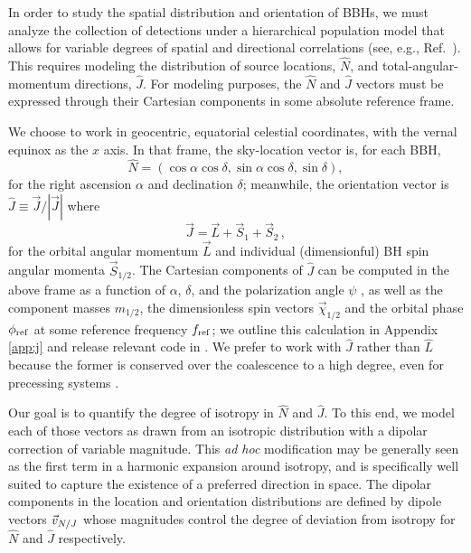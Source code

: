 \documentclass[aps,prd,twocolumn,superscriptaddress,preprintnumbers,floatfix,nofootinbib]{revtex4-2}
\begin{document}
In order to study the spatial distribution and orientation of \acp{BBH}, we must analyze the collection of detections under a hierarchical population model that allows for variable degrees of spatial and directional correlations (see, e.g., Ref.~\cite{Essick:2022slj}).
This requires modeling the distribution of source locations, $\hat{N}$, and total-angular-momentum directions, $\hat{J}$.
For modeling purposes, the $\hat{N}$ and $\hat{J}$ vectors must be expressed through their Cartesian components in some absolute reference frame.

We choose to work in geocentric, equatorial celestial coordinates, with the vernal equinox as the $x$ axis.
In that frame, the sky-location vector is, for each \ac{BBH},
\begin{equation} \label{eq:n}
\hat{N} = \left( \cos\alpha \cos\delta, \sin\alpha \cos\delta, \sin\delta \right) ,
\end{equation}
for the right ascension $\alpha$ and declination $\delta$; meanwhile, the orientation vector is $\hat{J} \equiv \vec{J} / |\vec{J}|$ where
\begin{equation} \label{eq:j}
\vec{J} = \vec{L} + \vec{S}_1 + \vec{S}_2 \, ,
\end{equation}
for the orbital angular momentum $\vec{L}$ and individual (dimensionful) \ac{BH} spin angular momenta $\vec{S}_{1/2}$.
The Cartesian components of $\hat{J}$ can be computed in the above frame as a function of $\alpha$, $\delta$, and the polarization angle $\psi$ \cite{Isi:2022mbx}, as well as the component masses $m_{1/2}$, the dimensionless spin vectors $\vec{\chi}_{1/2}$ and the orbital phase $\phi_{\rm ref}$ at some reference frequency $f_{\rm ref}$; we outline this calculation in Appendix \ref{app:j} and release relevant code in \cite{repo}.
We prefer to work with $\hat{J}$ rather than $\hat{L}$ because the former is conserved over the coalescence to a high degree, even for precessing systems \cite{poisson2014gravity}.

Our goal is to quantify the degree of isotropy in $\hat{N}$ and $\hat{J}$.
To this end, we model each of those vectors as drawn from an isotropic distribution with a dipolar correction of variable magnitude.
This \emph{ad hoc} modification may be generally seen as the first term in a harmonic expansion around isotropy, and is specifically well suited to capture the existence of a preferred direction in space.
The dipolar components in the location and orientation distributions are defined by dipole vectors $\vec{v}_{N/J}$ whose magnitudes control the degree of deviation from isotropy for $\hat{N}$ and $\hat{J}$ respectively. 
\end{document}
